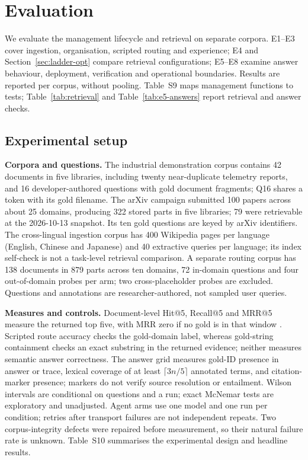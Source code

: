 \section{Evaluation}
\label{sec:eval}
We evaluate the management lifecycle and retrieval on separate corpora. E1--E3
cover ingestion, organisation, scripted routing and experience; E4 and
Section~\ref{sec:ladder-opt} compare retrieval configurations; E5--E8 examine
answer behaviour, deployment, verification and operational boundaries. Results
are reported per corpus, without pooling. Table~S9 maps management functions
to tests; Table~\ref{tab:retrieval} and Table~\ref{tab:e5-answers} report
retrieval and answer checks.

\subsection{Experimental setup}
\label{sec:eval-setup}
\textbf{Corpora and questions.} The industrial demonstration corpus contains
42 documents in five libraries, including twenty near-duplicate telemetry
reports, and 16 developer-authored questions with gold document fragments; Q16
shares a token with its gold filename. The arXiv campaign submitted 100 papers
across about 25 domains, producing 322 stored parts in five libraries; 79 were
retrievable at the 2026-10-13 snapshot. Its ten gold questions are keyed by
arXiv identifiers. The cross-lingual ingestion corpus has 400 Wikipedia pages
per language (English, Chinese and Japanese) and 40 extractive queries per
language; its index self-check is not a task-level retrieval comparison. A
separate routing corpus has 138 documents in 879 parts across ten domains,
72 in-domain questions and four out-of-domain probes per arm; two
cross-placeholder probes are excluded. Questions and annotations are
researcher-authored, not sampled user queries.

\textbf{Measures and controls.} Document-level Hit@5, Recall@5 and MRR@5
measure the returned top five, with MRR zero if no gold is in that window
\cite{craswell-msmarco-2021}. Scripted route accuracy checks the gold-domain
label, whereas gold-string containment checks an exact substring in the
returned evidence; neither measures semantic answer correctness. The answer
grid measures gold-ID presence in answer or trace, lexical coverage of at
least $\lceil3n/5\rceil$ annotated terms, and citation-marker presence;
markers do not verify source resolution or entailment. Wilson intervals are
conditional on questions and a run; exact McNemar tests are exploratory and
unadjusted. Agent arms use one model and one run per condition; retries after
transport failures are not independent repeats. Two corpus-integrity defects
were repaired before measurement, so their natural failure rate is unknown.
Table~S10 summarises the experimental design and headline results.

